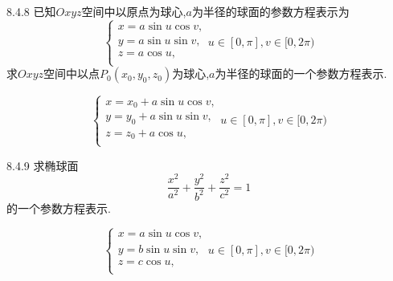 \begin{exercise}{8.4.8}
    已知$Oxyz$空间中以原点为球心,$a$为半径的球面的参数方程表示为
    $$\begin{cases}
        x=a\sin u\cos v,\\
        y=a\sin u\sin v,\\
        z=a\cos u,\\
    \end{cases}u\in[0,\pi],v\in[0,2\pi)$$
    求$Oxyz$空间中以点$P_0(x_0,y_0,z_0)$为球心,$a$为半径的球面的一个参数方程表示.
\end{exercise}
\begin{solution}
    $$\begin{cases}
        x=x_0+a\sin u\cos v,\\
        y=y_0+a\sin u\sin v,\\
        z=z_0+a\cos u,\\
    \end{cases}u\in[0,\pi],v\in[0,2\pi)$$
\end{solution}

\begin{exercise}{8.4.9}
    求椭球面$$\frac{x^2}{a^2}+\frac{y^2}{b^2}+\frac{z^2}{c^2}=1$$的一个参数方程表示.
\end{exercise}
\begin{solution}
    $$\begin{cases}
        x=a\sin u\cos v,\\
        y=b\sin u\sin v,\\
        z=c\cos u,\\
    \end{cases}u\in[0,\pi],v\in[0,2\pi)$$
\end{solution}

